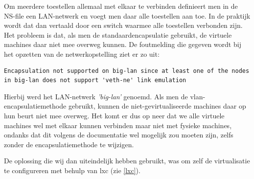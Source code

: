 Om meerdere toestellen allemaal met elkaar te verbinden definieert men in de NS-file een LAN-netwerk en voegt men daar alle toestellen aan toe.
In de praktijk wordt dat dan vertaald door een switch waarmee alle toestellen verbonden zijn.
Het probleem is dat, als men de standaardencapsulatie gebruikt, de virtuele machines daar niet mee overweg kunnen.
De foutmelding die gegeven wordt bij het opzetten van de netwerkopstelling ziet er zo uit:

\begin{lstlisting}
Encapsulation not supported on big-lan since at least one of the nodes in big-lan does not support 'veth-ne' link emulation
\end{lstlisting}

Hierbij werd het LAN-netwerk \textit{'big-lan'} genoemd.
Als men de vlan-encapsulatiemethode gebruikt, kunnen de niet-gevirtualiseerde machines daar op hun beurt niet mee overweg.
Het komt er dus op neer dat we alle virtuele machines wel met elkaar kunnen verbinden maar niet met fysieke machines,
ondanks dat dit volgens de documentatie wel mogelijk zou moeten zijn, zelfs zonder de encapsulatiemethode te wijzigen\cite{vwall-openvz}.

De oplossing die wij dan uiteindelijk hebben gebruikt, was om zelf de virtualisatie te configureren met behulp van \gls{lxc} (zie \cref{lxc}).


